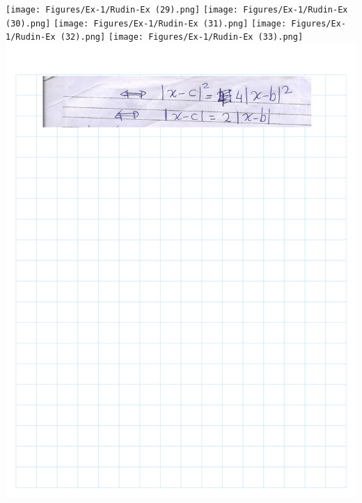 \documentclass[
]{book}
\theoremstyle{definition}
\theoremstyle{definition}
\theoremstyle{definition}
\theoremstyle{definition}
\theoremstyle{remark}
\begin{document}
\texttt{[image: Figures/Ex-1/Rudin-Ex (29).png]}
\texttt{[image: Figures/Ex-1/Rudin-Ex (30).png]}
\texttt{[image: Figures/Ex-1/Rudin-Ex (31).png]}
\texttt{[image: Figures/Ex-1/Rudin-Ex (32).png]}
\texttt{[image: Figures/Ex-1/Rudin-Ex (33).png]}
\includegraphics{Figures/Ex-1/Rudin-Ex (34).png}
\end{document}
